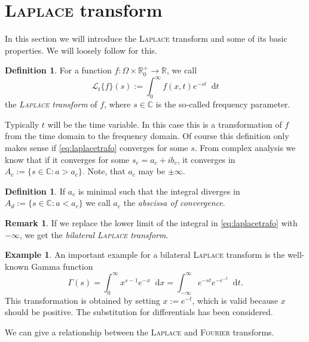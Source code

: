 \documentclass[12pt,a4paper,twoside, open=right]{scrreprt}
\theoremstyle{definition}
\newtheorem{rem}[auf]{Remark}
\newtheorem{defn}[auf]{Definition}
\newtheorem{bsp}[auf]{Example}
\theoremstyle{plain}
\newcommand{\rr}{\mathbb{R}}
\newcommand{\cc}{\mathbb{C}}
\newcommand{\D}{\mathop{}\!\mathrm{d}}
\begin{document}
\section{\textsc{Laplace} transform}
\label{sec:laplacetransform}
In this section we will introduce the \textsc{Laplace} transform and some of its basic properties. We will loosely follow \cite{Widder1945} for this.
\begin{defn}
    For a function $f\colon\Omega\times\rr^+_0\to\rr$, we call
    \begin{equation}
       \mathcal{L}_t\{f\}(s):=\int_0^\infty f(x,t)e^{-st}\D t\label{eq:laplacetrafo}
    \end{equation}
    the \emph{\textsc{Laplace} transform} of $f$, where $s\in\cc$ is the so-called frequency parameter. 
\end{defn}
Typically $t$ will be the time variable. In this case this is a transformation of $f$ from the time domain to the frequency domain. Of course this definition only makes sense if \eqref{eq:laplacetrafo} converges for some $s$. From complex analysis we know that if it converges for some $s_c=a_c+ib_c$, it converges in $A_c:=\{s\in\cc\colon a>a_c\}$. Note, that $a_c$ may be $\pm\infty$.
\begin{defn}
    If $a_c$ is minimal such that the integral diverges in $A_d:=\{s\in\cc\colon a<a_c\}$ we call $a_c$ the \emph{abscissa of convergence}. 
\end{defn}
\begin{rem}
    If we replace the lower limit of the integral in \eqref{eq:laplacetrafo} with $-\infty$, we get the \emph{bilateral \textsc{Laplace} transform}.
\end{rem}
\begin{bsp}
    An important example for a bilateral \textsc{Laplace} transform is the well-known Gamma function
    \begin{equation}
        \Gamma(s)=\int_0^\infty x^{s-1}e^{-x}\D x=\int_{-\infty}^\infty e^{-st}e^{-e^{-t}}\D t.
    \end{equation}
    This transformation is obtained by setting $x:=e^{-t}$, which is valid because $x$ should be positive. The substitution for differentials has been considered. 
\end{bsp}
We can give a relationship between the \textsc{Laplace} and \textsc{Fourier} transforms.
\end{document}
